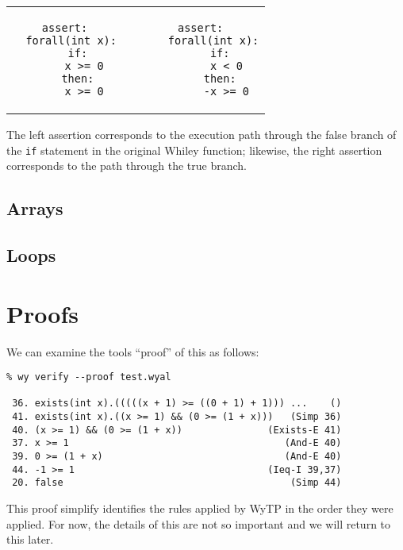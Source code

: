 \begin{center}
\begin{tabular}{c c c}
\begin{minipage}[t]{0.45\textwidth}
\begin{lstlisting}[language=WyAL]
assert:
  forall(int x):
    if:
      x >= 0
    then:
      x >= 0
\end{lstlisting}
\end{minipage}&&
\begin{minipage}[t]{0.45\textwidth}
\begin{lstlisting}[language=WyAL]
  assert:
    forall(int x):
      if:
        x < 0
      then:
        -x >= 0
\end{lstlisting}
\end{minipage}\\
\end{tabular}
\end{center}
The left assertion corresponds to the execution path through the false
branch of the \lstinline{if} statement in the original Whiley
function; likewise, the right assertion corresponds to the path
through the true branch.  

\subsection{Arrays}
\subsection{Loops}


\section{Proofs}

We can examine the tools ``proof'' of this as follows:
\begin{verbatim}
% wy verify --proof test.wyal

 36. exists(int x).(((((x + 1) >= ((0 + 1) + 1))) ...    () 
 41. exists(int x).((x >= 1) && (0 >= (1 + x)))   (Simp 36) 
 40. (x >= 1) && (0 >= (1 + x))               (Exists-E 41) 
 37. x >= 1                                      (And-E 40) 
 39. 0 >= (1 + x)                                (And-E 40) 
 44. -1 >= 1                                  (Ieq-I 39,37) 
 20. false                                        (Simp 44) 
\end{verbatim}
This proof simplify identifies the rules applied by WyTP in the order
they were applied.  For now, the details of this are not so important
and we will return to this later.
